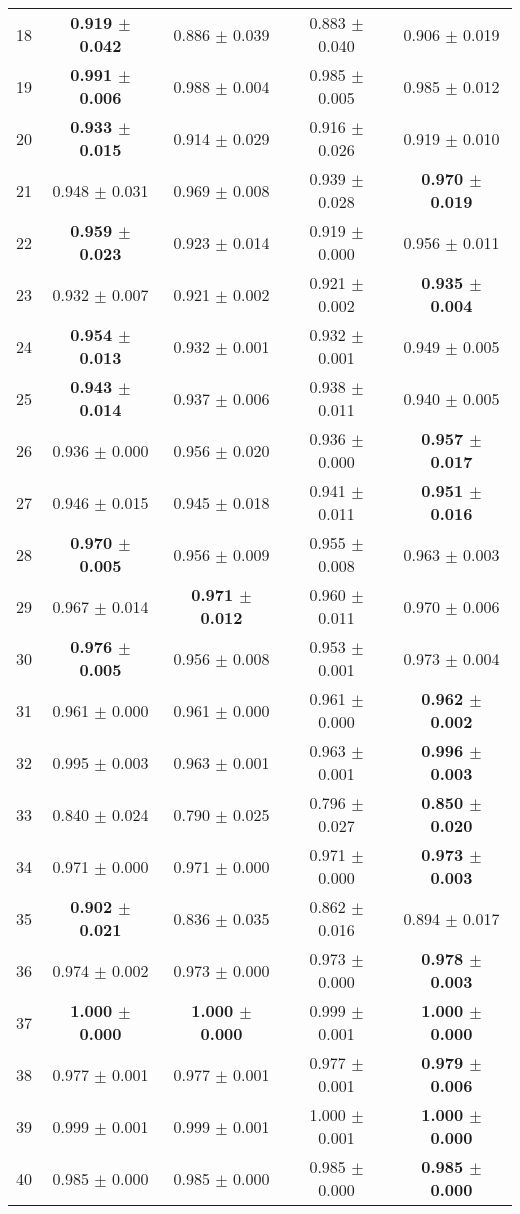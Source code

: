 \begin{table}[!ht]
{\begin{tabular}{r c c c c}
18 & \textbf{0.919 $\pm$ 0.042} & 0.886 $\pm$ 0.039 & 0.883 $\pm$ 0.040 & 0.906 $\pm$ 0.019 \\
19 & \textbf{0.991 $\pm$ 0.006} & 0.988 $\pm$ 0.004 & 0.985 $\pm$ 0.005 & 0.985 $\pm$ 0.012 \\
20 & \textbf{0.933 $\pm$ 0.015} & 0.914 $\pm$ 0.029 & 0.916 $\pm$ 0.026 & 0.919 $\pm$ 0.010 \\
21 & 0.948 $\pm$ 0.031 & 0.969 $\pm$ 0.008 & 0.939 $\pm$ 0.028 & \textbf{0.970 $\pm$ 0.019} \\
22 & \textbf{0.959 $\pm$ 0.023} & 0.923 $\pm$ 0.014 & 0.919 $\pm$ 0.000 & 0.956 $\pm$ 0.011 \\
23 & 0.932 $\pm$ 0.007 & 0.921 $\pm$ 0.002 & 0.921 $\pm$ 0.002 & \textbf{0.935 $\pm$ 0.004} \\
24 & \textbf{0.954 $\pm$ 0.013} & 0.932 $\pm$ 0.001 & 0.932 $\pm$ 0.001 & 0.949 $\pm$ 0.005 \\
25 & \textbf{0.943 $\pm$ 0.014} & 0.937 $\pm$ 0.006 & 0.938 $\pm$ 0.011 & 0.940 $\pm$ 0.005 \\
26 & 0.936 $\pm$ 0.000 & 0.956 $\pm$ 0.020 & 0.936 $\pm$ 0.000 & \textbf{0.957 $\pm$ 0.017} \\
27 & 0.946 $\pm$ 0.015 & 0.945 $\pm$ 0.018 & 0.941 $\pm$ 0.011 & \textbf{0.951 $\pm$ 0.016} \\
28 & \textbf{0.970 $\pm$ 0.005} & 0.956 $\pm$ 0.009 & 0.955 $\pm$ 0.008 & 0.963 $\pm$ 0.003 \\
29 & 0.967 $\pm$ 0.014 & \textbf{0.971 $\pm$ 0.012} & 0.960 $\pm$ 0.011 & 0.970 $\pm$ 0.006 \\
30 & \textbf{0.976 $\pm$ 0.005} & 0.956 $\pm$ 0.008 & 0.953 $\pm$ 0.001 & 0.973 $\pm$ 0.004 \\
31 & 0.961 $\pm$ 0.000 & 0.961 $\pm$ 0.000 & 0.961 $\pm$ 0.000 & \textbf{0.962 $\pm$ 0.002} \\
32 & 0.995 $\pm$ 0.003 & 0.963 $\pm$ 0.001 & 0.963 $\pm$ 0.001 & \textbf{0.996 $\pm$ 0.003} \\
33 & 0.840 $\pm$ 0.024 & 0.790 $\pm$ 0.025 & 0.796 $\pm$ 0.027 & \textbf{0.850 $\pm$ 0.020} \\
34 & 0.971 $\pm$ 0.000 & 0.971 $\pm$ 0.000 & 0.971 $\pm$ 0.000 & \textbf{0.973 $\pm$ 0.003} \\
35 & \textbf{0.902 $\pm$ 0.021} & 0.836 $\pm$ 0.035 & 0.862 $\pm$ 0.016 & 0.894 $\pm$ 0.017 \\
36 & 0.974 $\pm$ 0.002 & 0.973 $\pm$ 0.000 & 0.973 $\pm$ 0.000 & \textbf{0.978 $\pm$ 0.003} \\
37 & \textbf{1.000 $\pm$ 0.000} & \textbf{1.000 $\pm$ 0.000} & 0.999 $\pm$ 0.001 & \textbf{1.000 $\pm$ 0.000} \\
38 & 0.977 $\pm$ 0.001 & 0.977 $\pm$ 0.001 & 0.977 $\pm$ 0.001 & \textbf{0.979 $\pm$ 0.006} \\
39 & 0.999 $\pm$ 0.001 & 0.999 $\pm$ 0.001 & 1.000 $\pm$ 0.001 & \textbf{1.000 $\pm$ 0.000} \\
40 & 0.985 $\pm$ 0.000 & 0.985 $\pm$ 0.000 & 0.985 $\pm$ 0.000 & \textbf{0.985 $\pm$ 0.000} \\
\end{tabular}}
\end{table}
